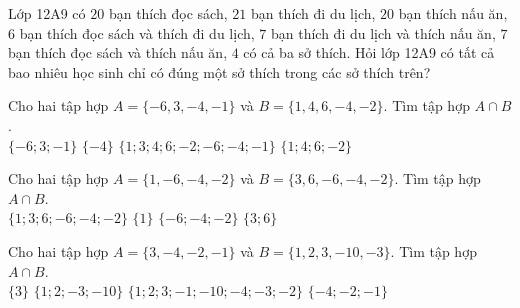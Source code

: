 \begin{ex}
 Lớp 12A9 có ${20}$ bạn thích đọc sách, ${21}$ bạn thích đi du lịch, ${20}$ bạn thích nấu ăn, ${6}$ bạn thích đọc sách và thích đi du lịch, ${7}$ bạn thích đi du lịch và thích nấu ăn, ${7}$ bạn thích đọc sách và thích nấu ăn, ${4}$ có cả ba sở thích. Hỏi lớp 12A9 có tất cả bao nhiêu học sinh chỉ có đúng một sở thích trong các sở thích trên?

\end{ex}
\begin{ex}
 Cho hai tập hợp $A=\{{-6, 3, -4, -1}\}$ và $B=\{{1, 4, 6, -4, -2}\}$. Tìm tập hợp $A\cap B$. \\ 
\choice
{ $\{{-6; 3; -1}\}$ }
   { \True $\{{-4}\}$ }
     { $\{{1; 3; 4; 6; -2; -6; -4; -1}\}$ }
    { $\{{1; 4; 6; -2}\}$ }
\loigiai{ 
  
 }\end{ex}

\begin{ex}
 Cho hai tập hợp $A=\{{1, -6, -4, -2}\}$ và $B=\{{3, 6, -6, -4, -2}\}$. Tìm tập hợp $A\cap B$. \\ 
\choice
{ $\{{1; 3; 6; -6; -4; -2}\}$ }
   { $\{{1}\}$ }
     { \True $\{{-6; -4; -2}\}$ }
    { $\{{3; 6}\}$ }
\loigiai{ 
  
 }\end{ex}

\begin{ex}
 Cho hai tập hợp $A=\{{3, -4, -2, -1}\}$ và $B=\{{1, 2, 3, -10, -3}\}$. Tìm tập hợp $A\cap B$. \\ 
\choice
{ \True $\{{3}\}$ }
   { $\{{1; 2; -3; -10}\}$ }
     { $\{{1; 2; 3; -1; -10; -4; -3; -2}\}$ }
    { $\{{-4; -2; -1}\}$ }
\loigiai{ 
  
 }\end{ex}

